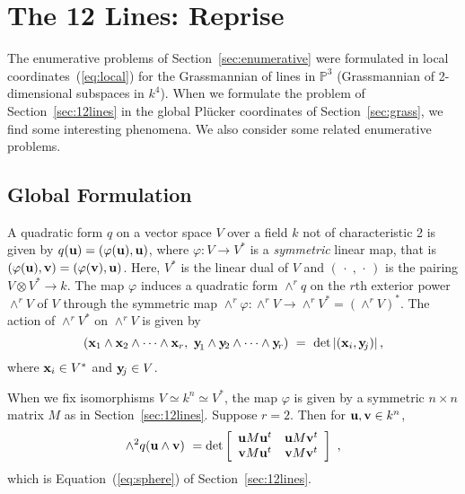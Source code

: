 \section{The 12 Lines: Reprise}
The enumerative problems of Section~\ref{sec:enumerative} were formulated
in local coordinates~(\ref{eq:local}) for the Grassmannian of lines in
${\mathbb P}^3$ (Grassmannian of 2-dimensional subspaces in $k^4$).
When we formulate the problem of Section~\ref{sec:12lines} in the global
Pl\"ucker coordinates of Section~\ref{sec:grass},
we find some interesting phenomena.
We also consider some related enumerative problems.

\subsection{Global Formulation}\label{sec:global}
A quadratic form $q$ on a vector space $V$ over a field
$k$ not of characteristic 2 is given by
$q({\bf u})=(\varphi({\bf u}),{\bf u})$, where $\varphi\colon V\to V^*$ is
a {\it symmetric} linear map, that is 
$(\varphi({\bf u}),{\bf v})=(\varphi({\bf v}),{\bf u})$.
Here, $V^*$ is the linear dual of $V$ and $(\,\cdot\;,\,\cdot\,)$ is the
pairing $V\otimes V^*\to k$. 
The map $\varphi$ induces a quadratic form $\wedge^rq$ on the $r$th exterior
power $\wedge^rV$ of $V$ through the symmetric map 
$\wedge^r\varphi\colon \wedge^rV\to\wedge^rV^*=(\wedge^rV)^*$.
The action of $\wedge^rV^*$ on $\wedge^rV$ is given by
%
\begin{equation}\label{eq:wedge}
  ({\bf x}_1\wedge{\bf x}_2\wedge\cdots\wedge{\bf x}_r,\ 
   {\bf y\!}_1\wedge{\bf y}\!_2\wedge\cdots\wedge{\bf y}\!_r)\ =\ 
   \det|({\bf x}_i, {\bf y}\!_j)|\,,
\end{equation}
%
where ${\bf x}_i\in V^*$ and ${\bf y}\!_j\in V$.

When we fix isomorphisms $V\simeq k^n\simeq V^*$, the map $\varphi$ is given
by a symmetric $n\times n$ matrix $M$ as in Section~\ref{sec:12lines}.
Suppose $r=2$.
Then for ${\bf u},{\bf v}\in k^n$,
$$
  \wedge^2q({\bf u}\wedge{\bf v})\ = 
              \det\left[\begin{array}{cc}
                    {\bf u}M{\bf u}^t &{\bf u}M{\bf v}^t\\
                    {\bf v}M{\bf u}^t &{\bf v}M{\bf v}^t
                  \end{array}\right]\ ,
$$
which is Equation~(\ref{eq:sphere}) of  Section~\ref{sec:12lines}.

